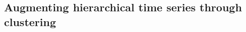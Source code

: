 \documentclass[a4paper,review,12pt,authoryear]{elsarticle}
\begin{document}
\subsection{Augmenting hierarchical time series through clustering}




\end{document}
